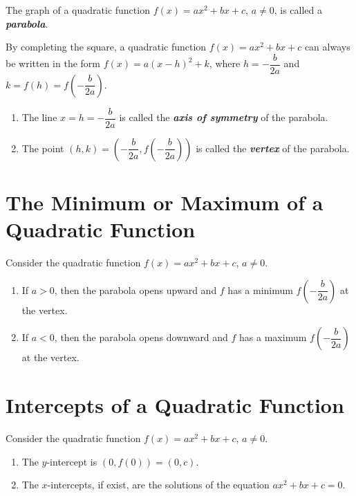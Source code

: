\documentclass[
  en,11pt]{elegantbook}
\begin{document}
The graph of a quadratic function \(f(x)=ax^2+bx+c\), \(a\neq 0\), is called a \textbf{\emph{parabola}}.

By completing the square, a quadratic function \(f(x)=ax^2+bx+c\) can always be written in the form \(f(x)=a(x-h)^2+k\), where \(h=-\dfrac{b}{2a}\) and \(k=f(h)=f\left(-\dfrac{b}{2a}\right)\).

\begin{enumerate}
\def\labelenumi{\arabic{enumi}.}

\item
  The line \(x=h=-\dfrac{b}{2a}\) is called the \textbf{\emph{axis of symmetry}} of the parabola.
\item
  The point \((h, k)=\left(-\dfrac{b}{2a}, f\left(-\dfrac{b}{2a}\right)\right)\) is called the \textbf{\emph{vertex}} of the parabola.
\end{enumerate}

\hypertarget{the-minimum-or-maximum-of-a-quadratic-function}{%
\section{The Minimum or Maximum of a Quadratic Function}\label{the-minimum-or-maximum-of-a-quadratic-function}}

Consider the quadratic function \(f(x)=ax^2+bx+c\), \(a\neq 0\).

\begin{enumerate}
\def\labelenumi{\arabic{enumi}.}

\item
  If \(a>0\), then the parabola opens upward and \(f\) has a minimum \(f\left(-\dfrac{b}{2a}\right)\) at the vertex.
\item
  If \(a<0\), then the parabola opens downward and \(f\) has a maximum \(f\left(-\dfrac{b}{2a}\right)\) at the vertex.
\end{enumerate}

\hypertarget{intercepts-of-a-quadratic-function}{%
\section{Intercepts of a Quadratic Function}\label{intercepts-of-a-quadratic-function}}

Consider the quadratic function \(f(x)=ax^2+bx+c\), \(a\neq 0\).

\begin{enumerate}
\def\labelenumi{\arabic{enumi}.}

\item
  The \(y\)-intercept is \((0, f(0))=(0, c)\).
\item
  The \(x\)-intercepts, if exist, are the solutions of the equation \(ax^2+bx+c=0\).
\end{enumerate}
\end{document}
